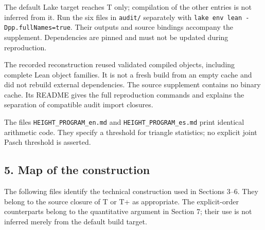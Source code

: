 \documentclass[english,11pt,a4paper]{article}
\begin{document}
The default Lake target reaches T only; compilation of the other entries is not inferred from it. Run the six files in \texttt{audit/\allowbreak{}} separately with \texttt{lake\ env\ lean\ -Dpp.\allowbreak{}full\allowbreak{}Names=true}. Their outputs and source bindings accompany the supplement. Dependencies are pinned and must not be updated during reproduction.

The recorded reconstruction reused validated compiled objects, including complete Lean object families. It is not a fresh build from an empty cache and did not rebuild external dependencies. The source supplement contains no binary cache. Its README gives the full reproduction commands and explains the separation of compatible audit import closures.

The files \texttt{HEIGHT\_\allowbreak{}PROGRAM\_\allowbreak{}en.\allowbreak{}md} and \texttt{HEIGHT\_\allowbreak{}PROGRAM\_\allowbreak{}es.\allowbreak{}md} print identical arithmetic code. They specify a threshold for triangle statistics; no explicit joint Pasch threshold is asserted.

\subsection{5. Map of the construction}\label{map-of-the-construction}

The following files identify the technical construction used in Sections 3--6. They belong to the source closure of T or T+ as appropriate. The explicit-order counterparts belong to the quantitative argument in Section 7; their use is not inferred merely from the default build target.
\end{document}
